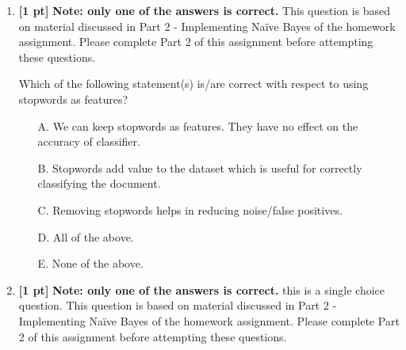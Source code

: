 \documentclass{article}
\begin{document}
\begin{enumerate}
    \item \textbf{[1 pt]} \textbf{Note: only one of the answers is correct.}  This question is based on material discussed in Part 2 - Implementing Na{\"i}ve Bayes of the homework assignment. Please complete Part 2 of this assignment before attempting these questions.
    
    Which of the following statement(s) is/are correct with respect to using stopwords as features?
    \begin{itemize}
        \item[A.] We can keep stopwords as features. They have no effect on the accuracy of classifier.
        \item[B.] Stopwords add value to the dataset which is useful for correctly classifying the document.
        \item[C.] Removing stopwords helps in reducing noise/false positives.
        \item[D.] All of the above.
        \item[E.] None of the above.
    \end{itemize}
    \begin{tcolorbox}[width=\linewidth/3,height=1.5cm]
    \end{tcolorbox}
    
    \item \textbf{[1 pt]} \textbf{Note: only one of the answers is correct.}  this is a single choice question. This question is based on material discussed in Part 2 - Implementing Na{\"i}ve Bayes of the homework assignment. Please complete Part 2 of this assignment before attempting these questions.
    

\end{enumerate}
\end{document}
